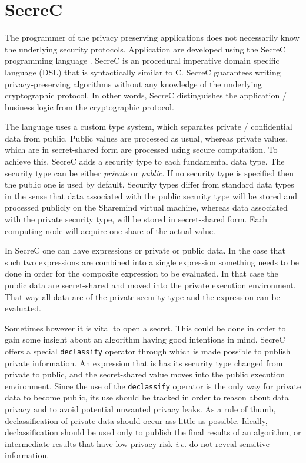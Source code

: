 \section{SecreC}

The programmer of the privacy preserving applications does not necessarily know the underlying security protocols.
Application are developed using the SecreC programming language \cite{jagomagis2010secrec}.
SecreC is an procedural imperative domain specific language (DSL) that is syntactically similar to C. SecreC guarantees writing privacy-preserving algorithms without any knowledge of the underlying cryptographic protocol.
In other words, SecreC distinguishes the application / business logic from the cryptographic protocol.

The language uses a custom type system, which separates private / confidential data from public.
Public values are processed as usual, whereas private values, which are in secret-shared form are processed using secure computation.
To achieve this, SecreC adds a security type to each fundamental data type.
The security type can be either \textit{private} or \textit{public}.
If no security type is specified then the public one is used by default.
Security types differ from standard data types in the sense that data associated with the public security type will be stored and processed publicly on the Sharemind virtual machine, whereas data associated with the private security type, will be stored in secret\hyp shared form.
Each computing node will acquire one share of the actual value.

In SecreC one can have expressions or private or public data.
In the case that such two expressions are combined into a single expression something needs to be done in order for the composite expression to be evaluated.
In that case the public data are secret\hyp shared and moved into the private execution environment.
That way all data are of the private security type and the expression can be evaluated.

Sometimes however it is vital to open a secret.
This could be done in order to gain some insight about an algorithm having good intentions in mind.
SecreC offers a special \texttt{declassify} operator through which is made possible to publish private information.
An expression that is   has its security type changed from private to public, and the secret\hyp shared value moves into the public execution environment.
Since the use of the \texttt{declassify} operator is the only way for private data to become public, its use should be tracked in order to reason about data privacy and to avoid potential unwanted privacy leaks.
As a rule of thumb, declassification of private data should occur ass little as possible.
Ideally, declassification should be used only to publish the final results of an algorithm, or intermediate results that have low privacy risk \textit{i.e.} do not reveal sensitive information.

